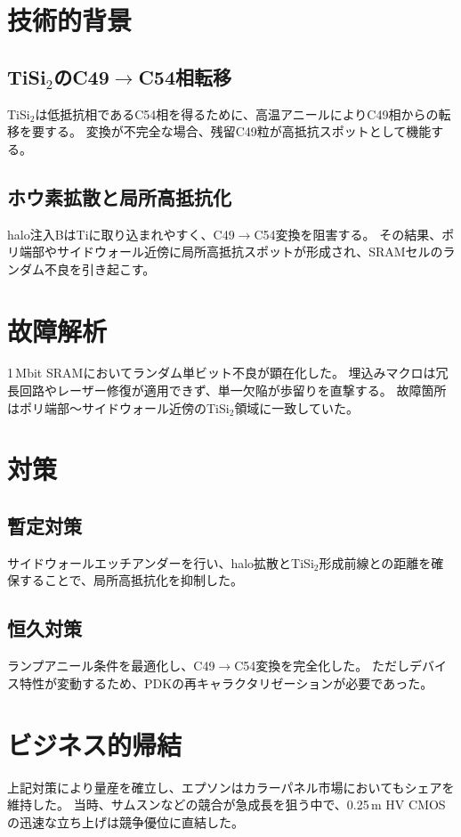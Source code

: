 \documentclass[conference]{IEEEtran}
\begin{document}
\section{技術的背景}
\subsection{TiSi$_2$のC49$\to$C54相転移}
TiSi$_2$は低抵抗相であるC54相を得るために、高温アニールによりC49相からの転移を要する。  
変換が不完全な場合、残留C49粒が高抵抗スポットとして機能する\cite{sze2007,wolf2000}。

\subsection{ホウ素拡散と局所高抵抗化}
halo注入BはTiに取り込まれやすく、C49$\to$C54変換を阻害する。  
その結果、ポリ端部やサイドウォール近傍に局所高抵抗スポットが形成され、SRAMセルのランダム不良を引き起こす。

\section{故障解析}
1\,Mbit SRAMにおいてランダム単ビット不良が顕在化した。  
埋込みマクロは冗長回路やレーザー修復が適用できず、単一欠陥が歩留りを直撃する。  
故障箇所はポリ端部〜サイドウォール近傍のTiSi$_2$領域に一致していた。

\section{対策}
\subsection{暫定対策}
サイドウォールエッチアンダーを行い、halo拡散とTiSi$_2$形成前線との距離を確保することで、局所高抵抗化を抑制した。

\subsection{恒久対策}
ランプアニール条件を最適化し、C49$\to$C54変換を完全化した。  
ただしデバイス特性が変動するため、PDKの再キャラクタリゼーションが必要であった。

\section{ビジネス的帰結}
上記対策により量産を確立し、エプソンはカラーパネル市場においてもシェアを維持した。  
当時、サムスンなどの競合が急成長を狙う中で、0.25\,\textmu m HV CMOSの迅速な立ち上げは競争優位に直結した。
\end{document}
